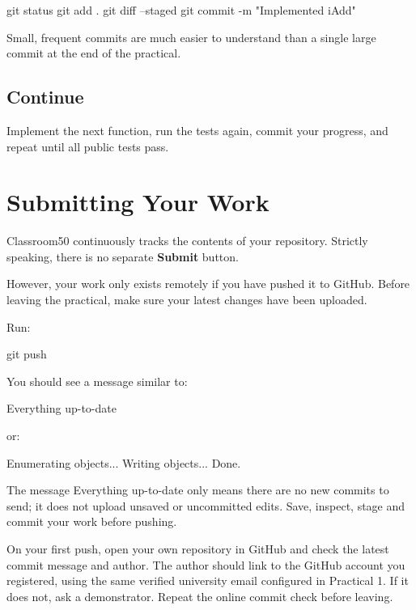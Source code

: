 \documentclass{csc2059practical}
\begin{document}
\begin{bashcode}
git status
git add .
git diff --staged
git commit -m "Implemented iAdd"
\end{bashcode}

Small, frequent commits are much easier to understand than a single large commit at the end of the practical.

\subsection{Continue}

Implement the next function, run the tests again, commit your progress, and repeat until all public tests pass.

\section{Submitting Your Work}

Classroom50 continuously tracks the contents of your repository. Strictly speaking, there is no separate \textbf{Submit} button.

However, your work only exists remotely if you have pushed it to GitHub. Before leaving the practical, make sure your latest changes have been uploaded.

Run:

\begin{bashcode}
git push
\end{bashcode}

You should see a message similar to:

\begin{terminal}
Everything up-to-date
\end{terminal}

or:

\begin{terminal}
Enumerating objects...
Writing objects...
Done.
\end{terminal}

The message Everything up-to-date only means there are no new commits to send; it does not upload unsaved or uncommitted edits. Save, inspect, stage and commit your work before pushing.

On your first push, open your own repository in GitHub and check the latest commit message and author. The author should link to the GitHub account you registered, using the same verified university email configured in Practical 1. If it does not, ask a demonstrator. Repeat the online commit check before leaving.
\end{document}
